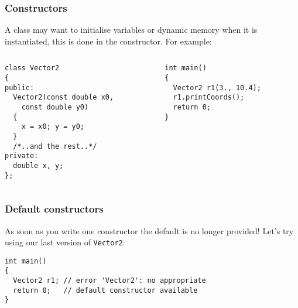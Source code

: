 \documentclass{beamer}
\begin{document}
\begin{frame}[fragile]
  \frametitle{Constructors}
  
  A class may want to initialise variables or dynamic memory when it is instantiated, this is done in the constructor.
  \pause
  For example:
  \begin{columns}[t]
    \begin{column}[T]{0.5\linewidth}
      \begin{lstlisting}[aboveskip=0pt,belowskip=0pt]
class Vector2
{
public:
  Vector2(const double x0,
    const double y0)
  {
    x = x0; y = y0;
  }
  /*..and the rest..*/
private:
  double x, y;
};
      \end{lstlisting}
    \end{column}
    \begin{column}[T]{0.5\linewidth}
      \begin{lstlisting}[aboveskip=0pt,belowskip=0pt]
int main()
{
  Vector2 r1(3., 10.4);
  r1.printCoords();
  return 0;
}
      \end{lstlisting}
    \end{column}
  \end{columns}  
	
\end{frame}

\begin{frame}[fragile]
  \frametitle{Default constructors}
  
  As soon as you write one constructor the default is no longer provided!\newline
  \pause
  Let's try using our last version of \texttt{Vector2}:
  \begin{lstlisting}
int main()
{
  Vector2 r1; // error 'Vector2': no appropriate
  return 0;	  // default constructor available
}
  \end{lstlisting}

\end{frame}
\end{document}
